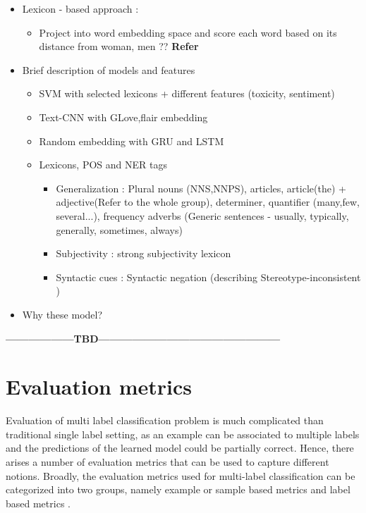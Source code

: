     \begin{itemize}
        \item Lexicon - based approach : 
        \begin{itemize}
            \item Project into word embedding space and score each word based on its distance from woman, men ??
            \textbf{Refer }\cite{cryan2020detecting}
        \end{itemize}
        \item Brief description of  models and features
        \begin{itemize}
            \item SVM with selected lexicons + different features (toxicity, sentiment)
            \item Text-CNN with GLove,flair embedding
            \item Random embedding with GRU and LSTM 
        \end{itemize}
        \begin{itemize}
            \item Lexicons, POS and NER tags 
            \begin{itemize}
                \item Generalization : Plural nouns (NNS,NNPS), articles, article(the) + adjective(Refer to the whole group), determiner, quantifier (many,few, several...), frequency adverbs (Generic sentences - usually, typically, generally, sometimes, always)
                \item Subjectivity : strong subjectivity lexicon \cite{tangpersonalized}
                \item Syntactic cues : Syntactic negation (describing Stereotype-inconsistent )
            \end{itemize}
        \end{itemize}
        \item Why these model?
    \end{itemize}
\textbf{------------------TBD------------------------------------------------}
\section{Evaluation metrics}
Evaluation of multi label classification problem is much complicated than traditional single label setting, as an example can be associated to multiple labels and the predictions of the learned model could be partially correct\cite{sorower2010literature}\cite{zhang2013review}. Hence, there arises a number of evaluation metrics that can be used to capture different notions. 
Broadly, the evaluation metrics used for multi-label classification can be categorized into two groups, namely example or sample based metrics and label based metrics \cite{zhang2013review}.
